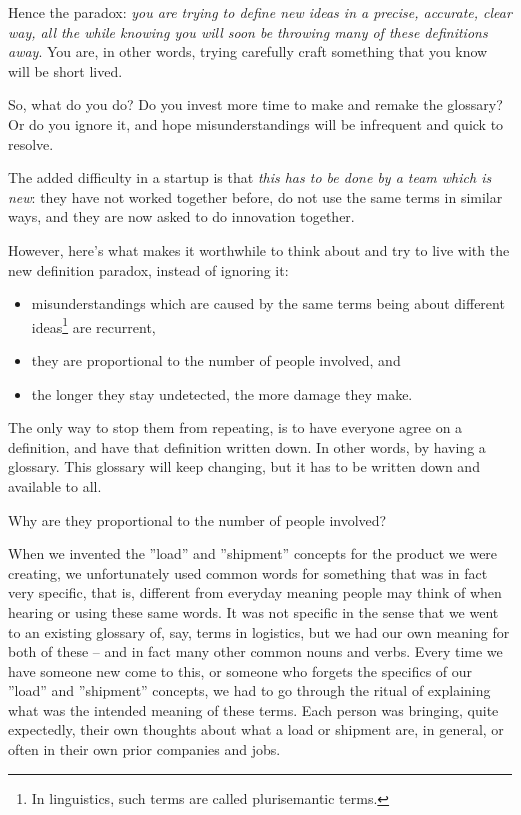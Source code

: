 \documentclass[graybox,envcountchap,sectrefs]{svmono}
\begin{document}
Hence the paradox: \textit{you are trying to define new ideas in a precise, accurate, clear way, all the while knowing you will soon be throwing many of these definitions away}. You are, in other words, trying carefully craft something that you know will be short lived.

So, what do you do? Do you invest more time to make and remake the glossary? Or do you ignore it, and hope misunderstandings will be infrequent and quick to resolve. 

The added difficulty in a startup is that \textit{this has to be done by a team which is new}: they have not worked together before, do not use the same terms in similar ways, and they are now asked to do innovation together.

However, here's what makes it worthwhile to think about and try to live with the new definition paradox, instead of ignoring it: 
\begin{itemize}
    \item misunderstandings which are caused by the same terms being about different ideas\footnote{In linguistics, such terms are called plurisemantic terms.} are recurrent,
    \item they are proportional to the number of people involved, and 
    \item the longer they stay undetected, the more damage they make. 
\end{itemize}

The only way to stop them from repeating, is to have everyone agree on a definition, and have that definition written down. In other words, by having a glossary. This glossary will keep changing, but it has to be written down and available to all.

Why are they proportional to the number of people involved? 

When we invented the ''load'' and ''shipment'' concepts for the product we were creating, we unfortunately used common words for something that was in fact very specific, that is, different from everyday meaning people may think of when hearing or using these same words. It was not specific in the sense that we went to an existing glossary of, say, terms in logistics, but we had our own meaning for both of these -- and in fact many other common nouns and verbs. Every time we have someone new come to this, or someone who forgets the specifics of our ''load'' and ''shipment'' concepts, we had to go through the ritual of explaining what was the intended meaning of these terms. Each person was bringing, quite expectedly, their own thoughts about what a load or shipment are, in general, or often in their own prior companies and jobs. 
\end{document}
